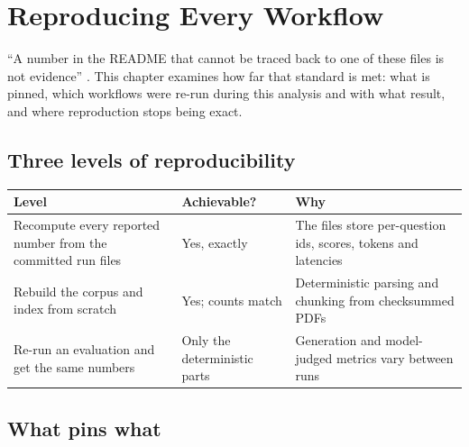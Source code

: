\chapter{Reproducing Every Workflow}
\label{ch:reproducibility}

\enquote{A number in the README that cannot be traced back to one of these files is not evidence} . This chapter examines how far that standard is met: what is pinned, which workflows were re-run during this analysis and with what result, and where reproduction stops being exact.

\section{Three levels of reproducibility}

\begin{center}
\begin{tabularx}{\textwidth}{@{}>{\raggedright\arraybackslash}p{4.4cm}>{\raggedright\arraybackslash}p{3.0cm}L@{}}
\toprule
\textbf{Level} & \textbf{Achievable?} & \textbf{Why}\\
\midrule
Recompute every reported number from the committed run files & Yes, exactly & The files store per-question ids, scores, tokens and latencies\\
Rebuild the corpus and index from scratch & Yes; counts match & Deterministic parsing and chunking from checksummed PDFs\\
Re-run an evaluation and get the same numbers & Only the deterministic parts & Generation and model-judged metrics vary between runs\\
\bottomrule
\end{tabularx}
\end{center}

\section{What pins what}

